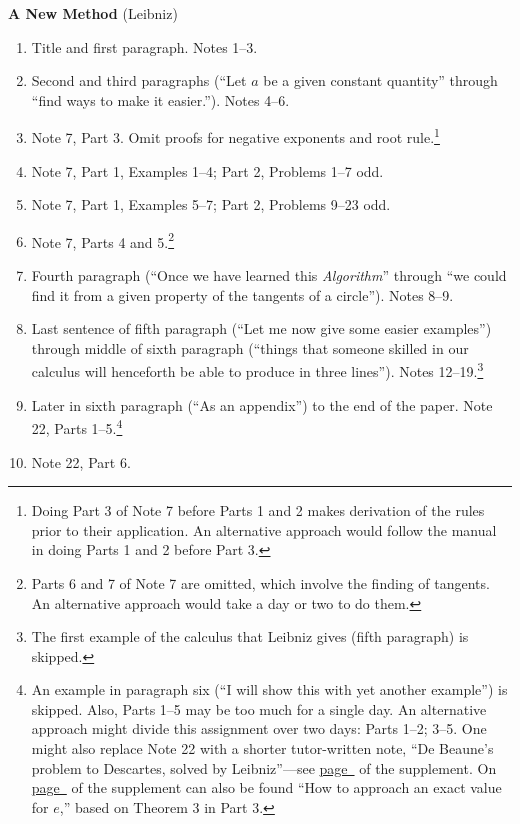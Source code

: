 \documentclass[10pt]{article}
\begin{document}
\textbf{A New Method} (Leibniz)
\begin{enumerate}[resume*] \item Title and first paragraph.
		Notes 1--3.  \item Second and third
		paragraphs (``Let $a$ be a given constant
		quantity'' through ``find ways to make it
		easier.''). Notes 4--6.  \item Note 7, Part
		3. Omit proofs for negative exponents and
		root rule.\footnote{Doing Part 3 of Note 7
			before Parts 1 and 2 makes
			derivation of the rules prior to
			their application. An alternative
			approach would follow the manual in
			doing Parts 1 and 2 before Part 3.}
	\item Note 7, Part 1, Examples 1--4; Part 2,
		Problems 1--7 odd.  \item Note 7, Part 1,
		Examples 5--7; Part 2, Problems 9--23 odd.
	\item Note 7, Parts 4 and 5.\footnote{Parts 6 and 7
			of Note 7 are omitted, which involve
			the finding of tangents. An
			alternative approach would take a
			day or two to do them.} \item Fourth
		paragraph (``Once we have learned this
		\emph{Algorithm}'' through ``we could find
		it from a given property of the tangents of
		a circle'').  Notes 8--9.  \item Last
		sentence of fifth paragraph (``Let me now
		give some easier examples'') through middle
		of sixth paragraph (``things that someone
		skilled in our calculus will henceforth be
		able to produce in three lines''). Notes
		12--19.\footnote{The first example of the
			calculus that Leibniz gives (fifth
			paragraph) is
			skipped.} \item Later in sixth
		paragraph (``As an appendix'') to the end of
		the paper.  Note 22, Parts 1--5.\footnote{An
			example in paragraph six (``I will
			show this with yet another
			example'') is skipped. Also, Parts
			1--5 may be too much for a single
			day. An alternative approach might
			divide this assignment over two
			days: Parts 1--2; 3--5. One might
			also replace Note 22 with a shorter
		tutor-written note, ``De Beaune’s problem to
		Descartes, solved by Leibniz''---see
		\hyperref[supple.14]{page~\pageref{supple.14}}
		of the supplement. On
	\hyperref[supple.20]{page~\pageref{supple.20}} of
	the supplement can also be found ``How to approach an
	exact value for $e$,'' based on Theorem 3 in Part
	3.} \item Note
		22, Part 6.  \end{enumerate}
	 
\end{document}
